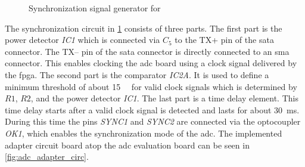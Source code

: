 \documentclass[12pt,a4paper,parskip=full,abstract=true,BCOR=12mm]{scrreprt}
\makeatletter
\newcommand\currentcoordinate{\the\tikz@lastxsaved,\the\tikz@lastysaved}
\def\device#1{\mbox{\textit{#1}}}
\makeatother
\begin{document}
\begin{figure}[htb]
{
    }
    \caption{Synchronization signal generator for }
    \label{fig:adc_adapter}
\end{figure}

The synchronization circuit in \cref{fig:adc_adapter} consists of three parts. The first part is the power detector \device{IC1}
which is connected via \device{$C_5$} to the TX+ pin of the \gls{sata} connector. The TX-- pin of the
\gls{sata} connector is directly connected to an \gls{sma} connector.
This enables clocking the \gls{adc} board using a clock signal delivered by the \gls{fpga}. The second part
is the comparator \device{IC2A}. It is used to define a minimum threshold of about \SI{15}{\milli\vrms}
for valid clock signals which is determined by \device{$R1$}, \device{$R2$}, and the power detector \device{IC1}. The last part is a time delay element. This time delay starts after a valid clock
signal is detected and lasts for about \SI{30}{\milli\second}. During
this time the pins \device{SYNC1} and \device{SYNC2} are connected via the optocoupler \device{OK1}, which
enables the synchronization mode of the \gls{adc}. The implemented adapter circuit board atop the
\gls{adc} evaluation board can be seen in \cref{fig:adc_adapter_circ}.
\end{document}
